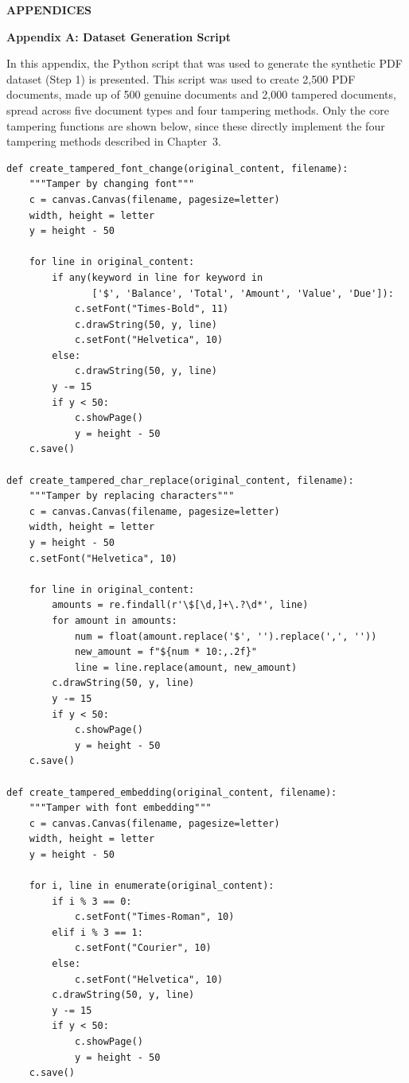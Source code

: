 \begin{center}
    \large{\textbf{APPENDICES}}
\end{center}

\appendix

\noindent
\textbf{Appendix A: Dataset Generation Script}

\noindent
In this appendix, the Python script that was used to generate the synthetic PDF dataset (Step 1) is presented. This script was used to create 2,500 PDF documents, made up of 500 genuine documents and 2,000 tampered documents, spread across five document types and four tampering methods. Only the core tampering functions are shown below, since these directly implement the four tampering methods described in Chapter~3.

\small
\begin{verbatim}
def create_tampered_font_change(original_content, filename):
    """Tamper by changing font"""
    c = canvas.Canvas(filename, pagesize=letter)
    width, height = letter
    y = height - 50

    for line in original_content:
        if any(keyword in line for keyword in
               ['$', 'Balance', 'Total', 'Amount', 'Value', 'Due']):
            c.setFont("Times-Bold", 11)
            c.drawString(50, y, line)
            c.setFont("Helvetica", 10)
        else:
            c.drawString(50, y, line)
        y -= 15
        if y < 50:
            c.showPage()
            y = height - 50
    c.save()

def create_tampered_char_replace(original_content, filename):
    """Tamper by replacing characters"""
    c = canvas.Canvas(filename, pagesize=letter)
    width, height = letter
    y = height - 50
    c.setFont("Helvetica", 10)

    for line in original_content:
        amounts = re.findall(r'\$[\d,]+\.?\d*', line)
        for amount in amounts:
            num = float(amount.replace('$', '').replace(',', ''))
            new_amount = f"${num * 10:,.2f}"
            line = line.replace(amount, new_amount)
        c.drawString(50, y, line)
        y -= 15
        if y < 50:
            c.showPage()
            y = height - 50
    c.save()

def create_tampered_embedding(original_content, filename):
    """Tamper with font embedding"""
    c = canvas.Canvas(filename, pagesize=letter)
    width, height = letter
    y = height - 50

    for i, line in enumerate(original_content):
        if i % 3 == 0:
            c.setFont("Times-Roman", 10)
        elif i % 3 == 1:
            c.setFont("Courier", 10)
        else:
            c.setFont("Helvetica", 10)
        c.drawString(50, y, line)
        y -= 15
        if y < 50:
            c.showPage()
            y = height - 50
    c.save()
\end{verbatim}

